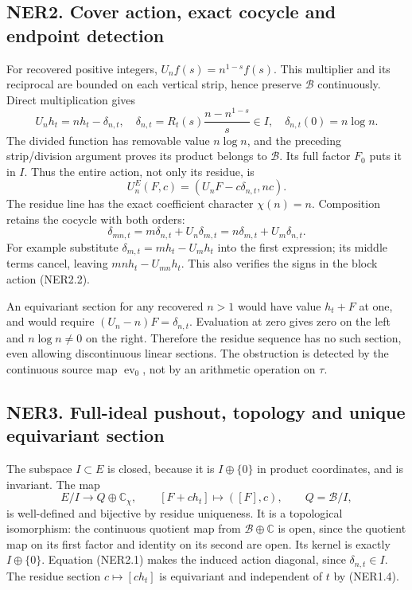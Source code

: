 \subsection{NER2. Cover action, exact cocycle and endpoint
detection}\label{ner2.-cover-action-exact-cocycle-and-endpoint-detection}

For recovered positive integers, \(U_nf(s)=n^{1-s}f(s)\). This
multiplier and its reciprocal are bounded on each vertical strip, hence
preserve \(\mathcal B\) continuously. Direct multiplication gives \[
U_nh_t=nh_t-\delta_{n,t},\quad
\delta_{n,t}=R_t(s)\frac{n-n^{1-s}}s\in I,
\quad\delta_{n,t}(0)=n\log n.
\tag{NER2.1}
\] The divided function has removable value \(n\log n\), and the
preceding strip/division argument proves its product belongs to
\(\mathcal B\). Its full factor \(F_0\) puts it in \(I\). Thus the
entire action, not only its residue, is \[
U_n^E(F,c)=(U_nF-c\delta_{n,t},nc).
\tag{NER2.2}
\] The residue line has the exact coefficient character \(\chi(n)=n\).
Composition retains the cocycle with both orders: \[
\delta_{mn,t}=m\delta_{n,t}+U_n\delta_{m,t}
=n\delta_{m,t}+U_m\delta_{n,t}.
\tag{NER2.3}
\] For example substitute \(\delta_{m,t}=mh_t-U_mh_t\) into the first
expression; its middle terms cancel, leaving \(mnh_t-U_{mn}h_t\). This
also verifies the signs in the block action (NER2.2).

An equivariant section for any recovered \(n>1\) would have value
\(h_t+F\) at one, and would require \((U_n-n)F=\delta_{n,t}\).
Evaluation at zero gives zero on the left and \(n\log n\ne0\) on the
right. Therefore the residue sequence has no such section, even allowing
discontinuous linear sections. The obstruction is detected by the
continuous source map \(\operatorname{ev}_0\), not by an arithmetic
operation on \(\tau\).

\subsection{NER3. Full-ideal pushout, topology and unique equivariant
section}\label{ner3.-full-ideal-pushout-topology-and-unique-equivariant-section}

The subspace \(I\subset E\) is closed, because it is \(I\oplus\{0\}\) in
product coordinates, and is invariant. The map \[
E/I\longrightarrow Q\oplus\mathbb C_\chi,
\qquad[F+ch_t]\longmapsto([F],c),\qquad Q=\mathcal B/I,
\tag{NER3.1}
\] is well-defined and bijective by residue uniqueness. It is a
topological isomorphism: the continuous quotient map from
\(\mathcal B\oplus\mathbb C\) is open, since the quotient map on its
first factor and identity on its second are open. Its kernel is exactly
\(I\oplus\{0\}\). Equation (NER2.1) makes the induced action diagonal,
since \(\delta_{n,t}\in I\). The residue section \(c\mapsto[ ch_t]\) is
equivariant and independent of \(t\) by (NER1.4).

